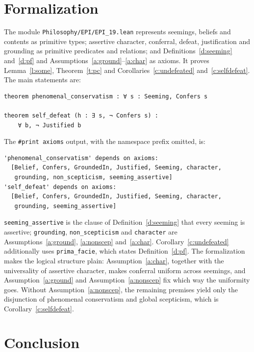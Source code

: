 \documentclass{situationist-preprint}
\begin{document}
\section{Formalization}

The module \nolinkurl{Philosophy/EPI/EPI_19.lean} represents seemings, beliefs and contents as primitive types; assertive character, conferral, defeat, justification and grounding as primitive predicates and relations; and Definitions~\ref{d:seeming} and~\ref{d:pf} and Assumptions~\ref{a:ground}--\ref{a:char} as axioms. It proves Lemma~\ref{l:some}, Theorem~\ref{t:pc} and Corollaries~\ref{c:undefeated} and~\ref{c:selfdefeat}. The main statements are:

\begin{lstlisting}
theorem phenomenal_conservatism : ∀ s : Seeming, Confers s

theorem self_defeat (h : ∃ s, ¬ Confers s) :
    ∀ b, ¬ Justified b
\end{lstlisting}

The \texttt{\#print axioms} output, with the namespace prefix omitted, is:

\begin{lstlisting}
'phenomenal_conservatism' depends on axioms:
  [Belief, Confers, GroundedIn, Justified, Seeming, character,
   grounding, non_scepticism, seeming_assertive]
'self_defeat' depends on axioms:
  [Belief, Confers, GroundedIn, Justified, Seeming, character,
   grounding, seeming_assertive]
\end{lstlisting}

\texttt{seeming\_assertive} is the clause of Definition~\ref{d:seeming} that every seeming is assertive; \texttt{grounding}, \texttt{non\_scepticism} and \texttt{character} are Assumptions~\ref{a:ground}, \ref{a:nonscep} and~\ref{a:char}. Corollary~\ref{c:undefeated} additionally uses \texttt{prima\_facie}, which states Definition~\ref{d:pf}. The formalization makes the logical structure plain: Assumption~\ref{a:char}, together with the universality of assertive character, makes conferral uniform across seemings, and Assumption~\ref{a:ground} and Assumption~\ref{a:nonscep} fix which way the uniformity goes. Without Assumption~\ref{a:nonscep}, the remaining premises yield only the disjunction of phenomenal conservatism and global scepticism, which is Corollary~\ref{c:selfdefeat}.

\section{Conclusion}
\end{document}
